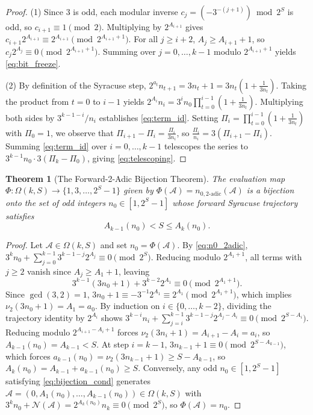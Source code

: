 \documentclass[11pt, a4paper]{amsart}
\newtheorem{theorem}{Theorem}[section]
\theoremstyle{definition}
\newcommand{\N}{\mathcal{N}}
\newcommand{\A}{\mathcal{A}}
\begin{document}
\begin{proof}
(1) Since $3$ is odd, each modular inverse $c_j = (-3^{-(j+1)}) \bmod 2^S$ is odd, so $c_{i+1} \equiv 1 \pmod 2$. Multiplying by $2^{A_{i+1}}$ gives $c_{i+1} 2^{A_{i+1}} \equiv 2^{A_{i+1}} \pmod{2^{A_{i+1}+1}}$. For all $j \ge i+2$, $A_j \ge A_{i+1} + 1$, so $c_j 2^{A_j} \equiv 0 \pmod{2^{A_{i+1}+1}}$. Summing over $j = 0, \dots, k-1$ modulo $2^{A_{i+1}+1}$ yields \eqref{eq:bit_freeze}.

(2) By definition of the Syracuse step, $2^{a_t} n_{t+1} = 3n_t + 1 = 3n_t(1 + \frac{1}{3n_t})$. Taking the product from $t=0$ to $i-1$ yields $2^{A_i} n_i = 3^i n_0 \prod_{t=0}^{i-1}(1 + \frac{1}{3n_t})$. Multiplying both sides by $3^{k-1-i} / n_i$ establishes \eqref{eq:term_id}. Setting $\Pi_i = \prod_{t=0}^{i-1}(1 + \frac{1}{3n_t})$ with $\Pi_0 = 1$, we observe that $\Pi_{i+1} - \Pi_i = \frac{\Pi_i}{3n_i}$, so $\frac{\Pi_i}{n_i} = 3(\Pi_{i+1} - \Pi_i)$. Summing \eqref{eq:term_id} over $i=0, \dots, k-1$ telescopes the series to $3^{k-1} n_0 \cdot 3(\Pi_k - \Pi_0)$, giving \eqref{eq:telescoping}.
\end{proof}

\begin{theorem}[The Forward-2-Adic Bijection Theorem]\label{thm:bijection}
The evaluation map $\Phi: \Omega(k, S) \to \{1, 3, \dots, 2^S - 1\}$ given by $\Phi(\A) = n_{0,\text{2-adic}}(\A)$ is a bijection onto the set of odd integers $n_0 \in [1, 2^S - 1]$ whose forward Syracuse trajectory satisfies
\begin{equation}\label{eq:bijection_cond}
A_{k-1}(n_0) < S \le A_k(n_0).
\end{equation}
\end{theorem}

\begin{proof}
Let $\A \in \Omega(k, S)$ and set $n_0 = \Phi(\A)$. By \eqref{eq:n0_2adic}, $3^k n_0 + \sum_{j=0}^{k-1} 3^{k-1-j} 2^{A_j} \equiv 0 \pmod{2^S}$. Reducing modulo $2^{A_1+1}$, all terms with $j \ge 2$ vanish since $A_j \ge A_1 + 1$, leaving
\[
3^{k-1}(3n_0 + 1) + 3^{k-2} 2^{A_1} \equiv 0 \pmod{2^{A_1+1}}.
\]
Since $\gcd(3, 2) = 1$, $3n_0 + 1 \equiv -3^{-1} 2^{A_1} \equiv 2^{A_1} \pmod{2^{A_1+1}}$, which implies $\nu_2(3n_0 + 1) = A_1 = a_0$. By induction on $i \in \{0, \dots, k-2\}$, dividing the trajectory identity by $2^{A_i}$ shows $3^{k-i} n_i + \sum_{j=i}^{k-1} 3^{k-1-j} 2^{A_j - A_i} \equiv 0 \pmod{2^{S - A_i}}$. Reducing modulo $2^{A_{i+1} - A_i + 1}$ forces $\nu_2(3n_i + 1) = A_{i+1} - A_i = a_i$, so $A_{k-1}(n_0) = A_{k-1} < S$. At step $i = k-1$, $3n_{k-1} + 1 \equiv 0 \pmod{2^{S - A_{k-1}}}$, which forces $a_{k-1}(n_0) = \nu_2(3n_{k-1} + 1) \ge S - A_{k-1}$, so $A_k(n_0) = A_{k-1} + a_{k-1}(n_0) \ge S$. Conversely, any odd $n_0 \in [1, 2^S - 1]$ satisfying \eqref{eq:bijection_cond} generates $\A = (0, A_1(n_0), \dots, A_{k-1}(n_0)) \in \Omega(k, S)$ with $3^k n_0 + \N(\A) = 2^{A_k(n_0)} n_k \equiv 0 \pmod{2^S}$, so $\Phi(\A) = n_0$.
\end{proof}
\end{document}
